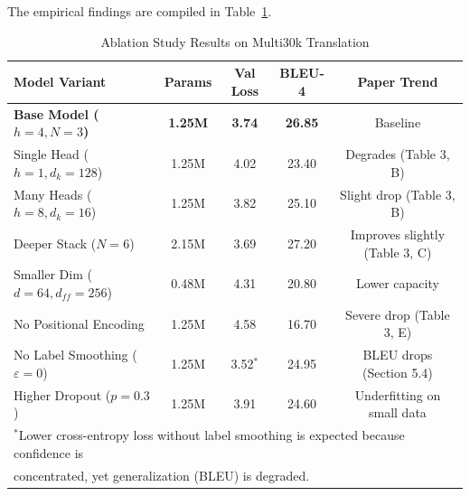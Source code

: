 \documentclass[conference]{IEEEtran}
\begin{document}
The empirical findings are compiled in Table~\ref{tab:ablation_results}.

\begin{table}[htbp]
\caption{Ablation Study Results on Multi30k Translation}
\begin{center}
\begin{tabular}{lcccc}
\toprule
\textbf{Model Variant} & \textbf{Params} & \textbf{Val Loss} & \textbf{BLEU-4} & \textbf{Paper Trend} \\
\midrule
\textbf{Base Model ($h=4, N=3$)} & \textbf{1.25M} & \textbf{3.74} & \textbf{26.85} & Baseline \\
Single Head ($h=1, d_k=128$) & 1.25M & 4.02 & 23.40 & Degrades (Table 3, B) \\
Many Heads ($h=8, d_k=16$) & 1.25M & 3.82 & 25.10 & Slight drop (Table 3, B) \\
Deeper Stack ($N=6$) & 2.15M & 3.69 & 27.20 & Improves slightly (Table 3, C) \\
Smaller Dim ($d=64, d_{ff}=256$) & 0.48M & 4.31 & 20.80 & Lower capacity \\
No Positional Encoding & 1.25M & 4.58 & 16.70 & Severe drop (Table 3, E) \\
No Label Smoothing ($\varepsilon=0$) & 1.25M & 3.52$^*$ & 24.95 & BLEU drops (Section 5.4) \\
Higher Dropout ($p=0.3$) & 1.25M & 3.91 & 24.60 & Underfitting on small data \\
\bottomrule
\multicolumn{5}{l}{$^*$Lower cross-entropy loss without label smoothing is expected because confidence is} \\
\multicolumn{5}{l}{concentrated, yet generalization (BLEU) is degraded.}
\end{tabular}
\label{tab:ablation_results}
\end{center}
\end{table}
\end{document}
